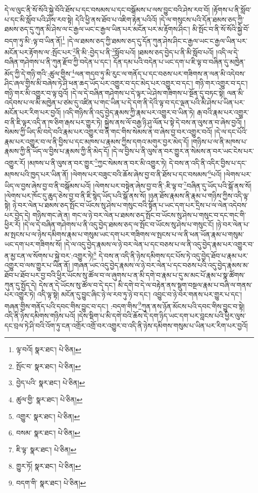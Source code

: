 དེ་ལ་ལུང་ནི་སོ་སོའི་སྐྱེ་བོའི་ཐོས་པ་དང་བསམས་པ་དང་བསྒོམས་པ་ལས་བྱུང་བའི་ཤེས་རབ་བོ། །རྟོགས་པ་ནི་སློབ་པ་དང་མི་སློབ་པའི་ཤེས་རབ་སྟེ། དེའི་ཕྱི་ནས་ཐོབ་པ་འཇིག་རྟེན་པའིའོ། །དེ་ལ་གསུངས་པའི་དོན་ཐམས་ཅད་ཀྱི་ཐམས་ཅད་དུ་ཀུན་མི་ཤེས་ལ་ང་རྒྱལ་ཡང་ང་རྒྱལ་ཡིན་པར་མངོན་པར་མ་རྟོགས་ཤིང་། མི་སྤོང་བ་ནི་སོ་སོའི་སྐྱེ་བོ་བདག་ཏུ་མི་:ལྟ་བ་ཡིན་ནོ།\footnote{ལྟ་བའོ།  སྣར་ཐང་།  པེ་ཅིན། } །དེ་ལ་ཐམས་ཅད་ཀྱི་ཐམས་ཅད་དུ་དོན་ཀུན་ཤེས་ཤིང་ང་རྒྱལ་ཡང་ང་རྒྱལ་ཡིན་པར་མངོན་པར་རྟོགས་ལ་:སྤོང་པར་\footnote{སྤོང་བ་  སྣར་ཐང་།  པེ་ཅིན། }ནི་མི་:བྱེད་པ་ནི་\footnote{བྱེད་པའི་  སྣར་ཐང་།  པེ་ཅིན། }སློབ་པའོ། །ཐམས་ཅད་བྱེད་པ་ནི་མི་སློབ་པའོ། །འདི་ལ་དེ་བཞིན་གཤེགས་པ་ནི་ཀུན་རྫོབ་ཀྱི་བདེན་པ་དང་། དོན་དམ་པའི་བདེན་པ་ཡང་དག་པ་ཇི་ལྟ་བ་བཞིན་དུ་མཁྱེན་མོད་ཀྱི་དེ་གཉི་གའི་:ཚུལ་གྱིས་\footnote{ཚུལ་གྱི་  སྣར་ཐང་།  པེ་ཅིན། }ལན་གདབ་ཏུ་མི་རུང་ལ་གནོད་པ་དང་བཅས་པར་གཟིགས་ན་ལན་མི་འདེབས་ཤིང་ཞལ་གྱིས་མི་བཞེས་ཏེ་ཤི་ཕན་ཆད་ཡོད་པར་འགྱུར་བ་དང་མེད་པར་འགྱུར་བ་དང་། གཉི་གར་འགྱུར་བ་དང་། གཉི་གར་མི་འགྱུར་བ་ལྟ་བུའོ། །དེ་ལ་དེ་བཞིན་གཤེགས་པ་དེ་ལྟར་ཡེ་ཤེས་གཟིགས་པ་སྔོན་དུ་བཏང་སྟེ། ལན་མི་འདེབས་པ་ལ་མི་མཁྱེན་པ་ཙམ་དུ་འཛིན་པ་གང་ཡིན་པ་དེ་དག་ནི་དེའི་ལྟ་བ་དང་ལྡན་པའི་མི་ཤེས་པ་ཡིན་པར་མངོན་པར་རིག་པར་བྱའོ། །འདི་གཉིས་ནི་འདུ་བྱེད་རྣམས་ཀྱི་རྣམ་པར་འགྱུར་བ་ཡིན་ཏེ། རྒ་བའི་རྣམ་པར་འགྱུར་བ་ནི་ཇི་ལྟར་འདི་ན་ཁ་ཅིག་རྒས་པར་གྱུར་ཏེ། སྐྱེས་ནས་ལོ་བརྒྱ་ཉི་ཤུ་ལོན་པ་སྟེ་དེ་བས་ན་ལུས་ན་བ་ཞེས་བྱའོ། །སེམས་ཀྱི་ཡིད་མི་བདེ་བའི་རྣམ་པར་འགྱུར་བ་ནི་གང་གིས་སེམས་ན་བ་ཞེས་བྱ་བར་འགྱུར་བའོ། །དེ་ལ་དང་པོའི་རྣམ་པར་འགྱུར་བ་ལ་ནི་བྱིས་པ་དང་མཁས་པ་རྣམས་ཀྱིས་དགའ་མགུར་བྱར་མེད་དོ། །གཉིས་པ་ལ་ནི་མཁས་པ་རྣམས་ཀྱི་ནི་ཡོད་ལ་བྱིས་པ་རྣམས་ཀྱི་ནི་མེད་དོ། །དེ་ལ་བྱིས་པ་ནི་ལུས་ན་བར་གྱུར་ན་སེམས་ན་བར་ཡང་ངེས་པར་འགྱུར་རོ། །མཁས་པ་ནི་ལུས་ན་བར་གྱུར་\footnote{འགྱུར་  སྣར་ཐང་།  པེ་ཅིན། }ཀྱང་སེམས་ན་བར་མི་འགྱུར་ཏེ། དེ་བས་ན་འདི་ནི་འདིར་བྱིས་པ་དང་མཁས་པའི་ཁྱད་པར་ཡིན་ནོ། །ལེགས་པར་བཟུང་བའི་ཆོས་ཞེས་བྱ་བ་ནི་ཐོས་པ་དང་བསམས་\footnote{བསམ་  སྣར་ཐང་།  པེ་ཅིན། }པའོ། །ལེགས་པར་ཡིད་ལ་བྱས་ཞེས་བྱ་བ་ནི་བསྒོམས་པའོ། །ལེགས་པར་བསྟེན་ཞེས་བྱ་བ་ནི་:ཇི་ལྟ་བ་\footnote{ཇི་ལྟ་  སྣར་ཐང་།  པེ་ཅིན། }བཞིན་དུ་ཡོད་པའི་སྒོ་ནས་སོ། །ལེགས་པར་ཁོང་དུ་ཆུད་ཅེས་བྱ་བ་ནི་ཇི་སྙེད་ཡོད་པའི་སྒོ་ནས་སོ། །ཉན་ཐོས་རྣམས་ནི་རྣམ་པ་གཉིས་ཀྱིས་འདི་ལྟ་སྟེ། ཉེ་བར་ལེན་པ་ཐམས་ཅད་སྤོང་བ་ཡོངས་སུ་ཤེས་པ་གསུང་བའི་སྟོན་པ་ཡང་དག་པར་དྲིས་པ་ལ་ལེན་འདེབས་པར་བྱེད་དེ། གཉིས་གང་ཞེ་ན། གང་ལ་ཉེ་བར་ལེན་པ་ཐམས་ཅད་སྤོང་བ་ཡོངས་སུ་ཤེས་པ་གསུང་བ་དང་གང་གི་ཕྱིར་རོ། །དེ་ལ་དེ་བཞིན་གཤེགས་པ་ནི་འདུ་བྱེད་ཐམས་ཅད་ལ་སྤོང་བ་ཡོངས་སུ་ཤེས་པ་གསུང་ངོ། །ཉེ་བར་ལེན་པ་མ་སྤངས་པ་ལ་ཉེས་དམིགས་རྣམ་པ་གསུམ་ཡང་དག་པར་གཟིགས་ལ་སྤངས་པ་ལ་ནི་ཕན་ཡོན་རྣམ་པ་གསུམ་ཡང་དག་པར་གཟིགས་སོ། །དེ་ལ་འདུ་བྱེད་རྣམས་ལ་ཉེ་བར་ལེན་པ་དང་བཅས་པ་ལ་ནི་འདུ་བྱེད་རྣམ་པར་འགྱུར་བ་ན་མྱ་ངན་ལ་སོགས་པ་སྐྱེ་བར་:འགྱུར་ཏེ།\footnote{གྱུར་ཏོ།  སྣར་ཐང་།  པེ་ཅིན། } དེ་བས་ན་འདི་ནི་ཉེས་དམིགས་དང་པོས་ཏེ་འདུ་བྱེད་ཐོབ་པ་རྣམ་པར་འགྱུར་བ་ལས་གྱུར་པ་ཡིན་ནོ། །གཞན་ཡང་འདུ་བྱེད་རྣམས་ལ་ཉེ་བར་ལེན་པ་དང་བཅས་པའི་འདུ་བྱེད་རྣམས་མ་ཐོབ་པ་ཐོབ་པར་བྱ་བའི་ཕྱིར་ཡོངས་སུ་ཚོལ་བ་ལ་ཞུགས་པ་ན་མི་དགེ་བ་རྣམ་པ་དུ་མ་མང་པོ་རྣམ་པ་སྣ་ཚོགས་ཀུན་དུ་སྤྱོད་དེ། དེས་ན་དེ་ཡོངས་སུ་ཚོལ་བ་དེ་དང་། མི་དགེ་བ་དེ་ལ་བརྟེན་ནས་སྡུག་བསྔལ་རྣམ་པ་བཞི་ལ་གནས་པར་འགྱུར་ཏེ། འདི་ལྟ་སྟེ། མངོན་དུ་བྱུང་ཞིང་ཉེ་ལ་རབ་ཏུ་ཉེ་བ་དང་། འབྱུང་བ་ཉེ་བར་གནས་པར་གྱུར་པ་དང་། གཞན་གྱིས་གནོད་པའི་དབང་གིས་བྱུང་བ་དང་། :བདག་གིས་\footnote{བདག་གི་  སྣར་ཐང་།  པེ་ཅིན། }ཀུན་ནས་ཉོན་མོངས་པའི་དབང་གིས་བྱུང་བ་སྟེ། འདི་ནི་ཉེས་དམིགས་གཉིས་པའོ། །དེས་སྡིག་པ་མི་དགེ་བའི་ཆོས་དེ་དག་ཉིད་ཡང་དག་པར་བླངས་པའི་ཕྱིར་ལུས་དང་བྲལ་ཏེ་ཤི་བའི་འོག་ཏུ་ངན་འགྲོར་འགྲོ་བར་འགྱུར་བ་འདི་ནི་ཉེས་དམིགས་གསུམ་པ་ཡིན་པར་རིག་པར་བྱའོ། 